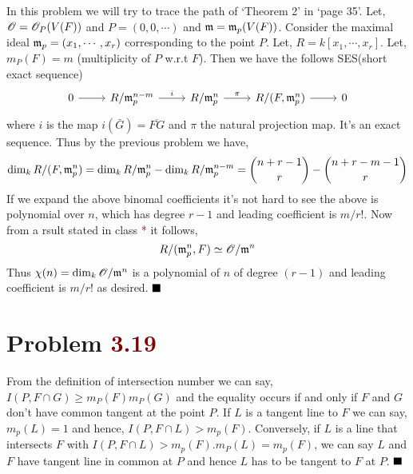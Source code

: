 \documentclass[12pt]{article}
\begin{document}
In this problem we will try to trace the path of `Theorem 2' in `page 35'. Let, $\mathscr{O} = \mathscr{O}_P(V(F))$ and $P=(0,0,\cdots)$ and $\mathfrak{m} = \mathfrak{m}_p(V(F))$. Consider the maximal ideal $\mathfrak{m}_p=(x_1,\cdots,x_r)$ corresponding to the point $P$. Let, $R = k[x_1,\cdots,x_r]$. Let, $m_P(F)=m$ (multiplicity of $P$ w.r.t $F$). Then we have the follows SES(short exact sequence) \[\begin{tikzcd}
        0 & {R/\m_p^{n-m}} & {R/\m_p^n} & {R/(F,\m_p^n)} & 0
        \arrow[from=1-1, to=1-2]
        \arrow["i", from=1-2, to=1-3]
        \arrow["\pi", from=1-3, to=1-4]
        \arrow[from=1-4, to=1-5]
    \end{tikzcd}\]
where $i$ is the map $i(\bar{G})=\overline{FG}$ and $\pi$ the natural projection map. It's an exact sequence. Thus by the previous problem we have, $$\dim_k R/(F,\mathfrak{m}_p^n) = \dim_k R/\mathfrak{m}_p^n - \dim_k R/\mathfrak{m}_p^{n-m}= \binom{n+r-1}{r}-\binom{n+r-m-1}{r}$$ If we expand the above binomal coefficients it's not hard to see the above is polynomial over $n$, which has degree $r-1$ and leading coefficient is $m/r!$. Now from a rsult stated in class \textcolor{maroon}{*} it follows, $$R/(\mathfrak{m}_p^n,F) \simeq \mathscr{O}/\mathfrak{m}^n$$ Thus $\chi(n) = \dim_k \mathscr{O}/\mathfrak{m}^n$ is a polynomial of $n$ of degree $(r-1)$ and leading coefficient is $m/r!$ as desired. $\hfill \blacksquare$

\section{Problem \textcolor{maroon}{3.19}}
From the definition of intersection number we can say, $I(P,F\cap G) \geq m_P(F)m_P(G)$ and the equality occurs if and only if $F$ and $G$ don't have common tangent at the point $P$. If $L$ is a tangent line to $F$ we can say, $m_p(L)=1$ and hence, $I(P,F \cap L) >m_p(F)$. Conversely, if $L$ is a line that intersects $F$ with $I(P,F\cap L)>m_p(F).m_P(L)=m_p(F)$, we can say $L$ and $F$ have tangent line in common at $P$ and hence $L$ has to be tangent to $F$ at $P$. $\hfill \blacksquare$
\end{document}
